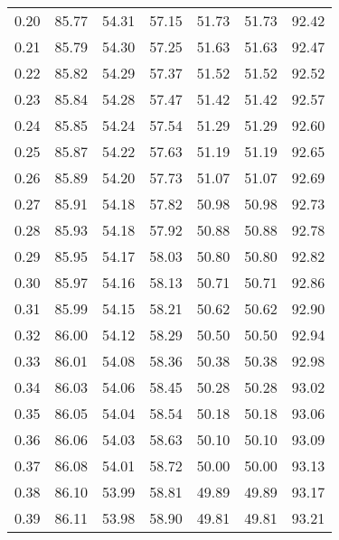 \begin{tabular}{|c|c|c|c|c|c|c|}
      0.20 &     85.77 &     54.31 &      57.15 &   51.73 &      51.73 &         92.42 \\
      0.21 &     85.79 &     54.30 &      57.25 &   51.63 &      51.63 &         92.47 \\
      0.22 &     85.82 &     54.29 &      57.37 &   51.52 &      51.52 &         92.52 \\
      0.23 &     85.84 &     54.28 &      57.47 &   51.42 &      51.42 &         92.57 \\
      0.24 &     85.85 &     54.24 &      57.54 &   51.29 &      51.29 &         92.60 \\
      0.25 &     85.87 &     54.22 &      57.63 &   51.19 &      51.19 &         92.65 \\
      0.26 &     85.89 &     54.20 &      57.73 &   51.07 &      51.07 &         92.69 \\
      0.27 &     85.91 &     54.18 &      57.82 &   50.98 &      50.98 &         92.73 \\
      0.28 &     85.93 &     54.18 &      57.92 &   50.88 &      50.88 &         92.78 \\
      0.29 &     85.95 &     54.17 &      58.03 &   50.80 &      50.80 &         92.82 \\
      0.30 &     85.97 &     54.16 &      58.13 &   50.71 &      50.71 &         92.86 \\
      0.31 &     85.99 &     54.15 &      58.21 &   50.62 &      50.62 &         92.90 \\
      0.32 &     86.00 &     54.12 &      58.29 &   50.50 &      50.50 &         92.94 \\
      0.33 &     86.01 &     54.08 &      58.36 &   50.38 &      50.38 &         92.98 \\
      0.34 &     86.03 &     54.06 &      58.45 &   50.28 &      50.28 &         93.02 \\
      0.35 &     86.05 &     54.04 &      58.54 &   50.18 &      50.18 &         93.06 \\
      0.36 &     86.06 &     54.03 &      58.63 &   50.10 &      50.10 &         93.09 \\
      0.37 &     86.08 &     54.01 &      58.72 &   50.00 &      50.00 &         93.13 \\
      0.38 &     86.10 &     53.99 &      58.81 &   49.89 &      49.89 &         93.17 \\
      0.39 &     86.11 &     53.98 &      58.90 &   49.81 &      49.81 &         93.21 \\

\end{tabular}
